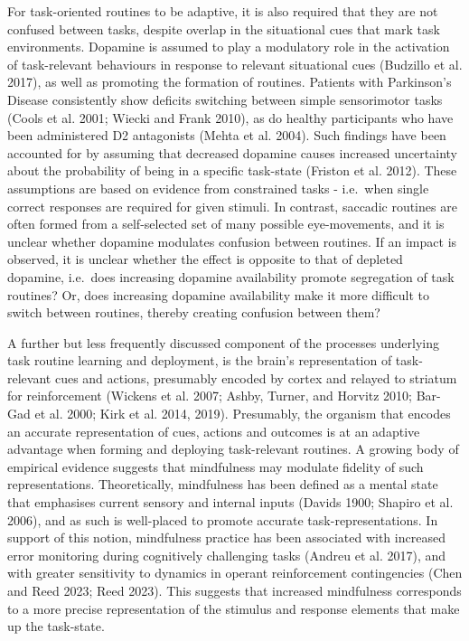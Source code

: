 \documentclass{article}
\begin{document}
For task-oriented routines to be adaptive, it is also required that they
are not confused between tasks, despite overlap in the situational cues
that mark task environments. Dopamine is assumed to play a modulatory
role in the activation of task-relevant behaviours in response to
relevant situational cues (Budzillo et al. 2017), as well as promoting
the formation of routines. Patients with Parkinson's Disease
consistently show deficits switching between simple sensorimotor tasks
(Cools et al. 2001; Wiecki and Frank 2010), as do healthy participants
who have been administered D2 antagonists (Mehta et al. 2004). Such
findings have been accounted for by assuming that decreased dopamine
causes increased uncertainty about the probability of being in a
specific task-state (Friston et al. 2012). These assumptions are based
on evidence from constrained tasks - i.e.~when single correct responses
are required for given stimuli. In contrast, saccadic routines are often
formed from a self-selected set of many possible eye-movements, and it
is unclear whether dopamine modulates confusion between routines. If an
impact is observed, it is unclear whether the effect is opposite to that
of depleted dopamine, i.e.~does increasing dopamine availability promote
segregation of task routines? Or, does increasing dopamine availability
make it more difficult to switch between routines, thereby creating
confusion between them?

A further but less frequently discussed component of the processes
underlying task routine learning and deployment, is the brain's
representation of task-relevant cues and actions, presumably encoded by
cortex and relayed to striatum for reinforcement (Wickens et al. 2007;
Ashby, Turner, and Horvitz 2010; Bar-Gad et al. 2000; Kirk et al. 2014,
2019). Presumably, the organism that encodes an accurate representation
of cues, actions and outcomes is at an adaptive advantage when forming
and deploying task-relevant routines. A growing body of empirical
evidence suggests that mindfulness may modulate fidelity of such
representations. Theoretically, mindfulness has been defined as a mental
state that emphasises current sensory and internal inputs (Davids 1900;
Shapiro et al. 2006), and as such is well-placed to promote accurate
task-representations. In support of this notion, mindfulness practice
has been associated with increased error monitoring during cognitively
challenging tasks (Andreu et al. 2017), and with greater sensitivity to
dynamics in operant reinforcement contingencies (Chen and Reed 2023;
Reed 2023). This suggests that increased mindfulness corresponds to a
more precise representation of the stimulus and response elements that
make up the task-state.
\end{document}
